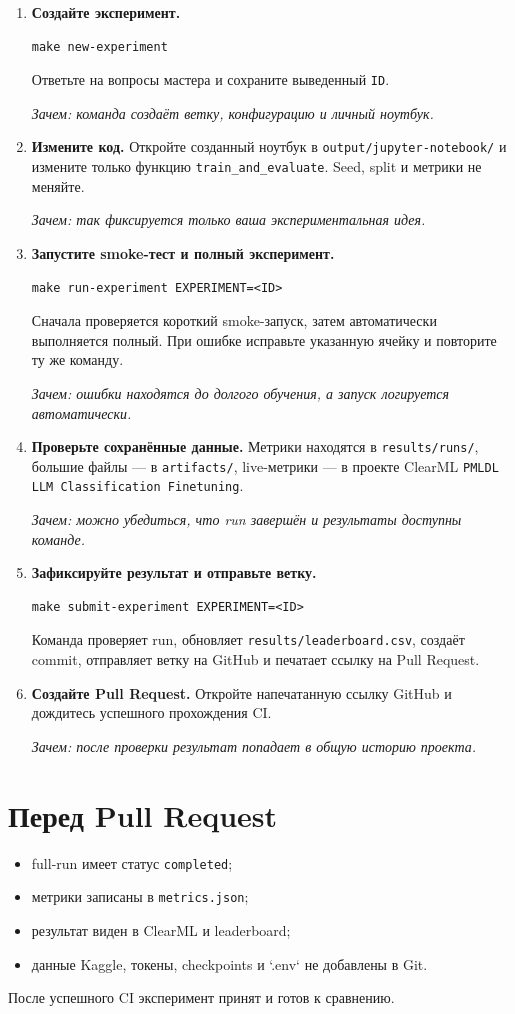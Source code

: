 \documentclass[a4paper,11pt]{article}
\newcommand{\step}[1]{\item \textcolor{accent}{\textbf{#1}}}
\newcommand{\why}[1]{\par\smallskip\textit{Зачем: #1}}
\begin{document}
\begin{enumerate}[leftmargin=*,itemsep=0.8em]
  \step{Создайте эксперимент.}
  \begin{lstlisting}[style=terminal]
make new-experiment
  \end{lstlisting}
  Ответьте на вопросы мастера и сохраните выведенный \texttt{ID}.
  \why{команда создаёт ветку, конфигурацию и личный ноутбук.}

  \step{Измените код.}
  Откройте созданный ноутбук в \texttt{output/jupyter-notebook/} и измените
  только функцию \texttt{train\_and\_evaluate}. Seed, split и метрики не меняйте.
  \why{так фиксируется только ваша экспериментальная идея.}

  \step{Запустите smoke-тест и полный эксперимент.}
  \begin{lstlisting}[style=terminal]
make run-experiment EXPERIMENT=<ID>
  \end{lstlisting}
  Сначала проверяется короткий smoke-запуск, затем автоматически выполняется
  полный. При ошибке исправьте указанную ячейку и повторите ту же команду.
  \why{ошибки находятся до долгого обучения, а запуск логируется автоматически.}

  \step{Проверьте сохранённые данные.}
  Метрики находятся в \texttt{results/runs/}, большие файлы --- в
  \texttt{artifacts/}, live-метрики --- в проекте ClearML
  \texttt{PMLDL LLM Classification Finetuning}.
  \why{можно убедиться, что run завершён и результаты доступны команде.}

  \step{Зафиксируйте результат и отправьте ветку.}
  \begin{lstlisting}[style=terminal]
make submit-experiment EXPERIMENT=<ID>
  \end{lstlisting}
  Команда проверяет run, обновляет \texttt{results/leaderboard.csv}, создаёт
  commit, отправляет ветку на GitHub и печатает ссылку на Pull Request.

  \step{Создайте Pull Request.}
  Откройте напечатанную ссылку GitHub и дождитесь успешного прохождения CI.
  \why{после проверки результат попадает в общую историю проекта.}
\end{enumerate}

\section*{Перед Pull Request}

\begin{itemize}[leftmargin=*,itemsep=0.35em]
  \item full-run имеет статус \texttt{completed};
  \item метрики записаны в \texttt{metrics.json};
  \item результат виден в ClearML и leaderboard;
  \item данные Kaggle, токены, checkpoints и `.env` не добавлены в Git.
\end{itemize}

\vfill
\begin{center}
  \small\color{darkgray}
  После успешного CI эксперимент принят и готов к сравнению.
\end{center}
\end{document}
